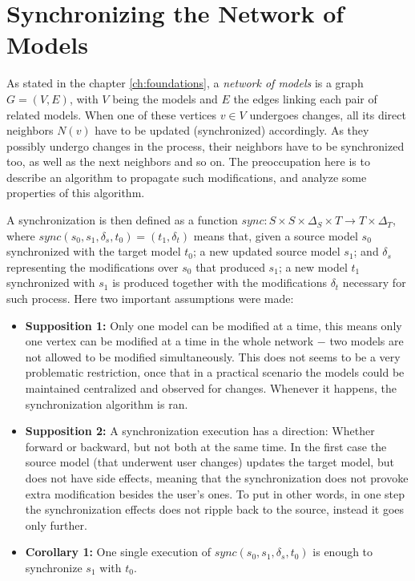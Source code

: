 \documentclass[tuberlin,cic,tc,english,noabntcite]{iiufrgs}
\begin{document}
\section{Synchronizing the Network of Models}
As stated in the chapter \ref{ch:foundations}, a \emph{network of models} is a graph $G = (V,E)$, with $V$ being the models and $E$ the edges linking each pair of related models. When one of these vertices $v \in V$ undergoes changes, all its direct neighbors $N(v)$ have to be updated (synchronized) accordingly. As they possibly undergo changes in the process, their neighbors have to be synchronized too, as well as the next neighbors and so on. The preoccupation here is to describe an algorithm to propagate such modifications, and analyze some properties of this algorithm.

A synchronization is then defined as a function $sync: S \times S \times \Delta_S \times T \rightarrow T \times \Delta_T$, where $sync (s_0, s_1, \delta_s, t_0) = (t_1, \delta_t)$ means that, given a source model $s_0$ synchronized with the target model $t_0$; a new updated source model $s_1$; and $\delta_s$ representing the modifications over $s_0$ that produced $s_1$; a new model $t_1$ synchronized with $s_1$ is produced together with the modifications $\delta_t$ necessary for such process. Here two important assumptions were made:

\begin{itemize}
\item \textbf{Supposition 1:} Only one model can be modified at a time, this means only one vertex can be modified at a time in the whole network $-$ two models are not allowed to be modified simultaneously. This does not seems to be a very problematic restriction, once that in a practical scenario the models could be maintained centralized and observed for changes. Whenever it happens, the synchronization algorithm is ran. 

\item \textbf{Supposition 2:} A synchronization execution has a direction: Whether forward or backward, but not both at the same time. In the first case the source model (that underwent user changes) updates the target model, but does not have side effects, meaning that the synchronization does not provoke extra modification besides the user's ones. To put in other words, in one step the synchronization effects does not ripple back to the source, instead it goes only further.

\item \textbf{Corollary 1:} One single execution of $sync (s_0, s_1, \delta_s, t_0)$ is enough to synchronize $s_1$ with $t_0$.
\end{itemize}
\end{document}
